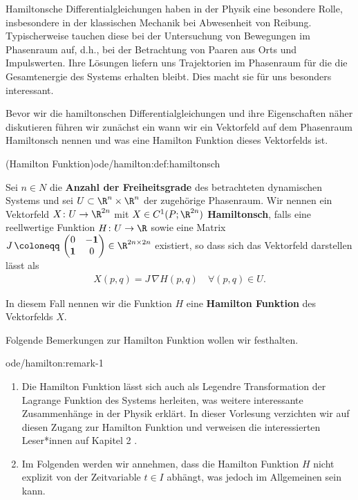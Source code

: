 \documentclass[letterpaper,10pt,english]{jupyterBook}
\begin{document}
\par
Hamiltonsche Differentialgleichungen haben in der Physik eine besondere Rolle, insbesondere in der klassischen Mechanik bei Abwesenheit von Reibung.
Typischerweise tauchen diese bei der Untersuchung von Bewegungen im Phasenraum auf, d.h., bei der Betrachtung von Paaren aus Orts  und Impulswerten.
Ihre Lösungen liefern uns Trajektorien im Phasenraum für die die Gesamtenergie des Systems erhalten bleibt.
Dies macht sie für uns besonders interessant.

\par
Bevor wir die hamiltonschen Differentialgleichungen und ihre Eigenschaften näher diskutieren führen wir zunächst ein wann wir ein Vektorfeld auf dem Phasenraum Hamiltonsch nennen und was eine Hamilton Funktion dieses Vektorfelds ist.
\begin{definition}{(Hamilton Funktion)}{ode/hamilton:def:hamiltonsch}



\par
Sei \(n \in N\) die \textbf{Anzahl der Freiheitsgrade} des betrachteten dynamischen Systems und sei \(U\subset \R^n \times \R^n\) der zugehörige Phasenraum.
Wir nennen ein Vektorfeld \(X \colon U \rightarrow \R^{2n}\) mit \(X \in C^1(P;\R^{2n})\) \textbf{Hamiltonsch}, falls eine reellwertige Funktion \(H \colon U \rightarrow \R\) sowie eine Matrix \(J \, \coloneqq \, \begin{pmatrix}0 & -\mathbf{1}\\ \mathbf{1} & 0 \end{pmatrix} \in \R^{2n \times 2n}\) existiert, so dass sich das Vektorfeld darstellen lässt als
\begin{align}\label{equation:ode/hamilton:eq:hamilton_Gleichung}
X(p,q) = J \, \nabla H (p,q) \quad \forall (p,q) \in U.
\end{align}
\par
In diesem Fall nennen wir die Funktion \(H\) eine \textbf{Hamilton Funktion} des Vektorfelds \(X\).
\end{definition}

\par
Folgende Bemerkungen zur Hamilton Funktion wollen wir festhalten.
\begin{remark}{}{ode/hamilton:remark-1}


\begin{enumerate}

\item {} 
\par
Die Hamilton Funktion lässt sich auch als Legendre Transformation der Lagrange Funktion des Systems herleiten, was weitere interessante Zusammenhänge in der Physik erklärt.
In dieser Vorlesung verzichten wir auf diesen Zugang zur Hamilton Funktion und verweisen die interessierten Leser*innen auf Kapitel 2 \cite{Nol11}.

\item {} 
\par
Im Folgenden werden wir annehmen, dass die Hamilton Funktion \(H\) nicht explizit von der Zeitvariable \(t \in I\) abhängt, was jedoch im Allgemeinen sein kann.

\end{enumerate}
\end{remark}
\end{document}
